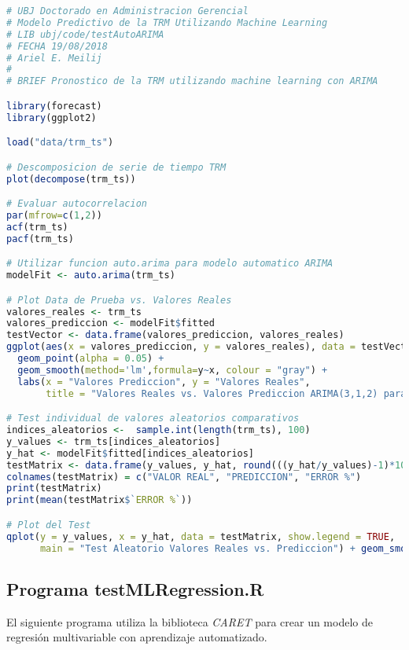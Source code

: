 \begin{lstlisting}[language=R]
# UBJ Doctorado en Administracion Gerencial
# Modelo Predictivo de la TRM Utilizando Machine Learning
# LIB ubj/code/testAutoARIMA
# FECHA 19/08/2018
# Ariel E. Meilij
#
# BRIEF Pronostico de la TRM utilizando machine learning con ARIMA

library(forecast)
library(ggplot2)

load("data/trm_ts")

# Descomposicion de serie de tiempo TRM
plot(decompose(trm_ts))

# Evaluar autocorrelacion
par(mfrow=c(1,2))
acf(trm_ts)
pacf(trm_ts)

# Utilizar funcion auto.arima para modelo automatico ARIMA
modelFit <- auto.arima(trm_ts)

# Plot Data de Prueba vs. Valores Reales
valores_reales <- trm_ts
valores_prediccion <- modelFit$fitted
testVector <- data.frame(valores_prediccion, valores_reales)
ggplot(aes(x = valores_prediccion, y = valores_reales), data = testVector) +
  geom_point(alpha = 0.05) +
  geom_smooth(method='lm',formula=y~x, colour = "gray") +
  labs(x = "Valores Prediccion", y = "Valores Reales",
       title = "Valores Reales vs. Valores Prediccion ARIMA(3,1,2) para TRM 2010-2017 ")

# Test individual de valores aleatorios comparativos
indices_aleatorios <-  sample.int(length(trm_ts), 100)
y_values <- trm_ts[indices_aleatorios]
y_hat <- modelFit$fitted[indices_aleatorios]
testMatrix <- data.frame(y_values, y_hat, round(((y_hat/y_values)-1)*100,1))
colnames(testMatrix) = c("VALOR REAL", "PREDICCION", "ERROR %")
print(testMatrix)
print(mean(testMatrix$`ERROR %`))

# Plot del Test
qplot(y = y_values, x = y_hat, data = testMatrix, show.legend = TRUE,
      main = "Test Aleatorio Valores Reales vs. Prediccion") + geom_smooth(formula = y~x)
\end{lstlisting}

\subsection{Programa testMLRegression.R}
El siguiente programa utiliza la biblioteca \emph{CARET} para crear un modelo de regresión multivariable con aprendizaje automatizado.

